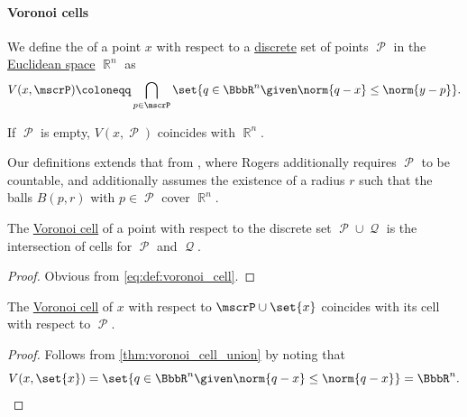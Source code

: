 \paragraph{Voronoi cells}

\begin{definition}\label{def:voronoi_cell}
  We define the  of a point \( x \) with respect to a \hyperref[def:discrete_set]{discrete} set of points \( \mscrP \) in the \hyperref[def:euclidean_space]{Euclidean space} \( \BbbR^n \) as
  \begin{equation}\label{eq:def:voronoi_cell}
    V(x, \mscrP) \coloneqq \bigcap_{p \in \mscrP} \set{ q \in \BbbR^n \given \norm{ q - x } \leq \norm{ y - p } }.
  \end{equation}

  If \( \mscrP \) is empty, \( V(x, \mscrP) \) coincides with \( \BbbR^n \).
\end{definition}
\begin{comments}
  \item Our definitions extends that from \cite[74]{Rogers1964PackingAndCovering}, where Rogers additionally requires \( \mscrP \) to be countable, and additionally assumes the existence of a radius \( r \) such that the balls \( B(p, r) \) with \( p \in \mscrP \) cover \( \BbbR^n \).
\end{comments}

\begin{proposition}\label{thm:voronoi_cell_union}
  The \hyperref[def:voronoi_cell]{Voronoi cell} of a point with respect to the discrete set \( \mscrP \cup \mscrQ \) is the intersection of cells for \( \mscrP \) and \( \mscrQ \).
\end{proposition}
\begin{proof}
  Obvious from \eqref{eq:def:voronoi_cell}.
\end{proof}

\begin{corollary}\label{thm:voronoi_cell_self}
  The \hyperref[def:voronoi_cell]{Voronoi cell} of \( x \) with respect to \( \mscrP \cup \set{ x } \) coincides with its cell with respect to \( \mscrP \).
\end{corollary}
\begin{proof}
  Follows from \cref{thm:voronoi_cell_union} by noting that
  \begin{equation*}
    V(x, \set{ x }) = \set{ q \in \BbbR^n \given \norm{ q - x } \leq \norm{ q - x } } = \BbbR^n.
  \end{equation*}
\end{proof}

